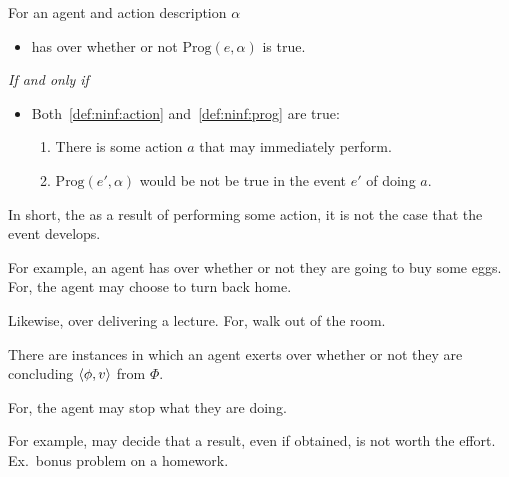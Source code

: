 \begin{note}
  \begin{definition}[\ninf{2}]
    \label{def:ninf}
    For an agent \vAgent{} and action description \(\alpha\)

    \begin{itemize}
    \item
      \vAgent{} has \ninf{} over whether or not \(\text{Prog}(e, \alpha)\) is true.
    \end{itemize}

    \emph{If and only if}

    \begin{itemize}
    \item
      Both~\ref{def:ninf:action} and~\ref{def:ninf:prog} are true:
      \begin{enumerate}[label=\alph*., ref=(\alph*)]
      \item
        \label{def:ninf:action}
        There is some action \(a\) that \vAgent{} may immediately perform.
      \item
        \label{def:ninf:prog}
        \(\text{Prog}(e', \alpha)\) would be not be true in the event \(e'\) of \vAgent{} doing \(a\).
      \end{enumerate}
    \end{itemize}
    \vspace{-\baselineskip}
  \end{definition}

  In short, the as a result of performing some action, it is not the case that the event develops.
\end{note}

\begin{note}
  For example, an agent has  over whether or not they are going to buy some eggs.
  For, the agent may choose to turn back home.

  Likewise, \ninf{} over delivering a lecture.
  For, walk out of the room.
\end{note}

\begin{note}
  \begin{observation}
    \label{ob:ninf}
    There are instances in which an agent exerts  over whether or not they are concluding \(\langle \phi, v \rangle\) from \(\Phi\).
  \end{observation}

  For, the agent may stop what they are doing.

  For example, may decide that a result, even if obtained, is not worth the effort.
  Ex.\ bonus problem on a homework.
\end{note}

